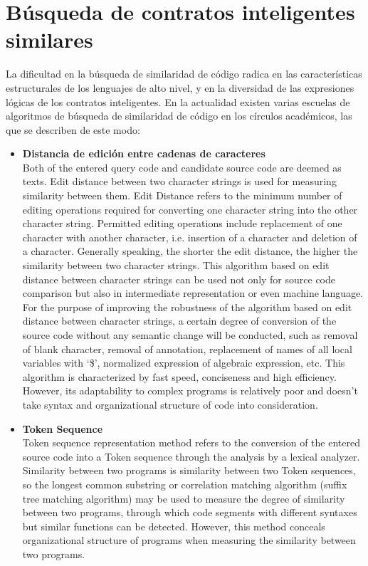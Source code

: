 \section{Búsqueda de contratos inteligentes similares}
\label{appendix:sim_code}

La dificultad en la búsqueda de similaridad de código radica en las características estructurales de los lenguajes de alto nivel, y en la diversidad de las expresiones lógicas de los contratos inteligentes. En la actualidad existen varias escuelas de algoritmos de búsqueda de similaridad de código en los círculos académicos, las que se describen de este modo:

\begin{itemize}
	\item \textbf{Distancia de edición entre cadenas de caracteres} \\
	Both of the entered query code and candidate source code are deemed as texts. Edit distance between two character strings is used for measuring similarity between them. Edit Distance refers to the minimum number of editing operations required for converting one character string into the other character string. Permitted editing operations include replacement of one character with another character, i.e. insertion of a character and deletion of a character. Generally speaking, the shorter the edit distance, the higher the similarity between two character strings. This algorithm based on edit distance between character strings can be used not only for source code comparison but also in intermediate representation or even machine language.
	For the purpose of improving the robustness of the algorithm based on edit distance between character strings, a certain degree of conversion of the source code without any semantic change will be conducted, such as removal of blank character, removal of annotation, replacement of names of all local variables with ‘\$’, normalized expression of algebraic expression, etc. This algorithm is characterized by fast speed, conciseness and high efficiency. However, its adaptability to complex programs is relatively poor and doesn't take syntax and organizational structure of code into consideration.


	\item \textbf{Token Sequence} \\
	Token sequence representation method refers to the conversion of the entered source code into a Token sequence through the analysis by a lexical analyzer. Similarity between two programs is similarity between two Token sequences, so the longest common substring or correlation matching algorithm (suffix tree matching algorithm) may be used to measure the degree of similarity between two programs, through which code segments with different syntaxes but similar functions can be detected. However, this method conceals organizational structure of programs when measuring the similarity between two programs.


\end{itemize}
